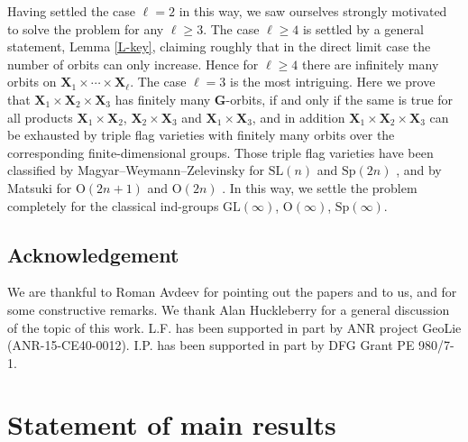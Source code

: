\documentclass[12pt]{amsart}
\newcommand{\GL}{\mathrm{GL}}
\newcommand{\SL}{\mathrm{SL}}
\newcommand{\Sp}{\mathrm{Sp}}
\renewcommand{\O}{\mathrm{O}}
\newcommand{\G}{\mathbf{G}}
\newcommand{\X}{\mathbf{X}}
\numberwithin{equation}{section}
\theoremstyle{definition}
\begin{document}
Having settled the case $\ell=2$ in this way, we saw ourselves strongly motivated to solve the problem for any $\ell\geq 3$. The case $\ell\geq 4$ is settled by a general statement, Lemma \ref{L-key}, claiming roughly that in the direct limit case the number of orbits can only increase. Hence for $\ell\geq 4$ there are infinitely many orbits on $\X_1\times\cdots\times\X_\ell$. 
The case $\ell=3$ is the most intriguing. Here we prove that $\X_1\times\X_2\times\X_3$ has finitely many $\G$-orbits, if and only if the same is true for all products
$\X_1\times \X_2$, $\X_2\times \X_3$ and $\X_1\times \X_3$, and in addition
$\X_1\times \X_2\times \X_3$
can be exhausted by triple flag varieties with finitely many orbits over the corresponding finite-dimensional groups. Those triple flag varieties have been classified by Magyar--Weymann--Zelevinsky for $\SL(n)$ and $\Sp(2n)$ \cite{MWZ1,MWZ2}, and by Matsuki for $\O(2n+1)$ and $\O(2n)$ \cite{Matsuki1,Matsuki2}. In this way, we settle the problem completely for the classical ind-groups $\GL(\infty)$, $\O(\infty)$, $\Sp(\infty)$.


\subsection*{Acknowledgement} We are thankful to Roman Avdeev for pointing out the papers \cite{BDEK} and \cite{Matsuki2} to us, and for some constructive remarks. We thank Alan Huckleberry for a general discussion of the topic of this work. L.F. has been supported in part by ANR project GeoLie (ANR-15-CE40-0012). I.P. has been supported in part by DFG Grant PE 980/7-1.

\section{Statement of main results}

\label{S1}
\end{document}
